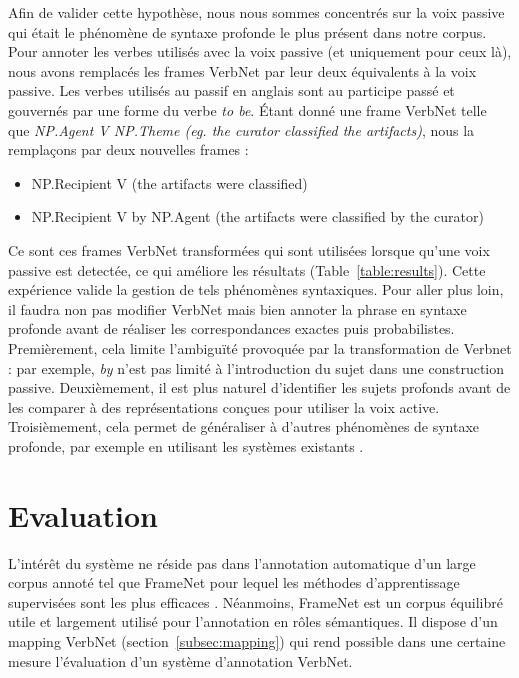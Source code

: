 Afin de valider cette hypothèse, nous nous sommes concentrés sur la voix
passive qui était le phénomène de syntaxe profonde le plus présent dans notre
corpus.  Pour annoter les verbes utilisés avec la voix passive (et uniquement
pour ceux là), nous avons remplacés les frames VerbNet par leur deux
équivalents à la voix passive. Les verbes utilisés au passif en anglais sont au
participe passé et gouvernés par une forme du verbe \emph{to be}. Étant donné
une frame VerbNet telle que \emph{NP.Agent V NP.Theme (eg. the
curator classified the artifacts)}, nous la remplaçons par deux nouvelles
frames :

\begin{itemize}
    \item NP.Recipient V (the artifacts were classified)
    \item NP.Recipient V by NP.Agent (the artifacts were classified by the curator)
\end{itemize}

Ce sont ces frames VerbNet transformées qui sont utilisées lorsque qu'une voix
passive est detectée, ce qui améliore les résultats
(Table~\ref{table:results}). Cette expérience valide la gestion de tels
phénomènes syntaxiques. Pour aller plus loin, il faudra non pas modifier
VerbNet mais bien annoter la phrase en syntaxe profonde avant de réaliser les
correspondances exactes puis probabilistes. Premièrement, cela limite
l'ambiguïté provoquée par la transformation de Verbnet : par exemple, \emph{by}
n'est pas limité à l'introduction du sujet dans une construction passive.
Deuxièmement, il est plus naturel d'identifier les sujets profonds avant de les
comparer à des représentations conçues pour utiliser la voix active.
Troisièmement, cela permet de généraliser à d'autres phénomènes de syntaxe
profonde, par exemple en utilisant les systèmes existants
\citep{bonfante2011modular,ribeyre2013systeme}.

\section{Evaluation}
\label{srl:evaluation}

L'intérêt du système ne réside pas dans l'annotation automatique d'un large
corpus annoté tel que FrameNet pour lequel les méthodes d'apprentissage
supervisées sont les plus efficaces \citep{das2014frame}. Néanmoins, FrameNet
est un corpus équilibré utile et largement utilisé pour l'annotation en rôles
sémantiques. Il dispose d'un mapping VerbNet (section~\ref{subsec:mapping}) qui
rend possible dans une certaine mesure l'évaluation d'un système d'annotation
VerbNet.

